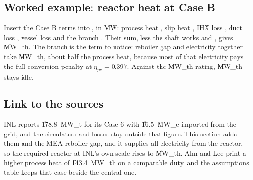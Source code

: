 \subsection*{Worked example: reactor heat at Case B}
Insert the Case B terms into , in \U{MW}: process heat \vQprocxB, slip heat \vQrecB, IHX loss \vQihxB, duct loss \vQductB, vessel loss \vQvesB{} and the branch \vQbrB. Their sum, less the shaft works \vWsB{} and \vWpB, gives \vQRxB{} \U{MW_{th}}. The branch is the term to notice: reboiler gap and electricity together take \vQbrB{} \U{MW_{th}}, about half the process heat, because most of that electricity pays the full conversion penalty at $\eta_{pc}=0.397$. Against the \cQrated{} \U{MW_{th}} rating, \vSpareB{} \U{MW_{th}} stays idle.

\subsection*{Link to the sources}
INL reports \U{178.8\ MW_t} for its Case 6 with \U{16.5\ MW_e} imported from the grid, and the circulators and losses stay outside that figure. This section adds them and the MEA reboiler gap, and it supplies all electricity from the reactor, so the required reactor at INL's own scale rises to \vQRxA{} \U{MW_{th}}. Ahn and Lee print a higher process heat of \U{143.4\ MW_{th}} on a comparable duty, and the assumptions table keeps that case beside the central one.
